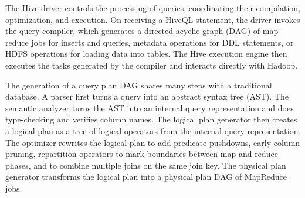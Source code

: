 The Hive driver controls the processing of queries, coordinating their compilation, optimization, and execution. On receiving a HiveQL statement, the driver invokes the query compiler, which generates a directed acyclic graph (DAG) of map-reduce jobs for inserts and queries, metadata operations for DDL statements, or HDFS operations for loading data into tables. The Hive execution engine then executes the tasks generated by the compiler and interacts directly with Hadoop.

The generation of a query plan DAG shares many steps with a traditional database. A parser first turns a query into an abstract syntax tree (AST). The semantic analyzer turns the AST into an internal query representation and does type-checking and verifies column names. The logical plan generator then creates a logical plan as a tree of logical operators from the internal query representation. The optimizer rewrites the logical plan to add predicate pushdowns, early column pruning, repartition operators to mark boundaries between map and reduce phases, and to combine multiple joins on the same join key. The physical plan generator transforms the logical plan into a physical plan DAG of MapReduce jobs.
